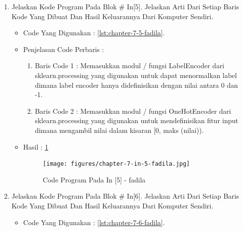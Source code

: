 \begin{enumerate}
\par
\par
\item Jelaskan Kode Program Pada Blok \# In[5]. Jelaskan Arti Dari Setiap Baris Kode Yang Dibuat Dan Hasil Keluarannya Dari Komputer Sendiri.
\begin{itemize}
\item Code Yang Digunakan : \ref{lst:chapter-7-5-fadila}.

\par
\par
\item Penjelasan Code Perbaris	: 
\begin{enumerate}
\item Baris Code 1	: Memasukkan modul / fungsi LabelEncoder dari sklearn.processing yang digunakan untuk dapat  menormalkan label dimana label encoder hanya didefinisikan dengan nilai antara 0 dan -1.
\item Baris Code 2	: Memasukkan modul / fungsi OneHotEncoder dari sklearn.processing yang digunakan untuk mendefinisikan fitur input dimana mengambil nilai dalam kisaran [0, maks (nilai)).
\end{enumerate}
\par
\item Hasil : \ref{chapter-7-in-5-fadila}
\par
\par
\begin{figure}[!hbtp]
\centering
\texttt{[image: figures/chapter-7-in-5-fadila.jpg]}
\caption{Code Program Pada In [5] - fadila}
\label{chapter-7-in-5-fadila}
\end{figure}
\par
\par
\end{itemize}
\par
\par
\par
\item Jelaskan Kode Program Pada Blok \# In[6]. Jelaskan Arti Dari Setiap Baris Kode Yang Dibuat Dan Hasil Keluarannya Dari Komputer Sendiri.
\begin{itemize}
\item Code Yang Digunakan : \ref{lst:chapter-7-6-fadila}.

\par

\end{itemize}
\end{enumerate}
